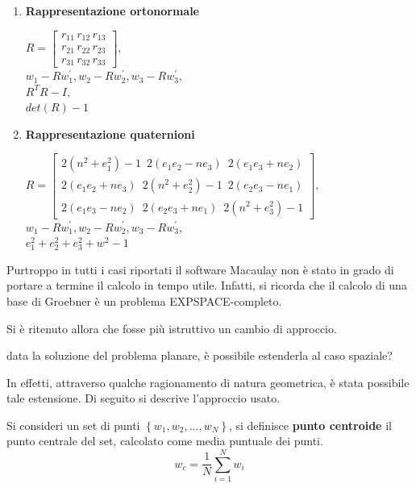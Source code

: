 \begin{enumerate}
	\item \textbf{Rappresentazione ortonormale}
	 \begin{center}
	 	$R = 
	 	\begin{bmatrix}
	 		r_{11} \, r_{12} \, r_{13} \\
	 		r_{21} \, r_{22} \, r_{23} \\
	 		r_{31} \, r_{32} \, r_{33} 	 	
	 	\end{bmatrix},$\\ \vspace{10pt}
	 	$w_1 - Rw_1^{'}, w_2 - Rw_2^{'}, w_3 - Rw_3^{'},$ \\
	 	$R^{T}R - I,$ \\
	 	$det(R) - 1$	 	
	 \end{center}
	\item \textbf{Rappresentazione quaternioni}  
	\begin{center}
		\nonumber $R = 
		\begin{bmatrix}
			2(n^2+e_1^2) - 1 \,\,\, 2(e_1e_2 - ne_3) \,\,\, 2(e_1e_3 + ne_2) \\
			2(e_1e_2+ne_3) \,\,\, 2(n^2+e_2^2) - 1 \,\,\, 2(e_2e_3 - ne_1) \\
			2(e_1e_3-ne_2) \,\,\, 2(e_2e_3+ne_1) \,\,\, 2(n^2+e_3^2) - 1	 	
		\end{bmatrix},$\\ \vspace{10pt}
		$w_1 -  Rw_1^{'}, w_2 - Rw_2^{'}, w_3 - Rw_3^{'},$ \\
		$e_1^2 + e_2^2 + e_3^2 + w^2 - 1 $
	\end{center}
\end{enumerate}

Purtroppo in tutti i casi riportati il software Macaulay non è stato in grado di portare a termine il calcolo in tempo utile. Infatti, si ricorda che il calcolo di una base di Groebner è un problema EXPSPACE-completo. 

Si è ritenuto allora che fosse più istruttivo un cambio di approccio.
\begin{pro}
	data la soluzione del problema planare, è possibile estenderla al caso spaziale?
\end{pro}

In effetti, attraverso qualche ragionamento di natura geometrica, è stata possibile tale estensione. Di seguito si descrive l'approccio usato.

\begin{defn}
	Si consideri un set di punti $\left\lbrace w_1, w_2, ..., w_N \right\rbrace$, si definisce \textbf{punto centroide} il punto centrale del set, calcolato come media puntuale dei punti.
	\begin{equation}
		w_c = \frac{1}{N}\sum_{i = 1}^{N} w_i
	\end{equation}
\end{defn}

